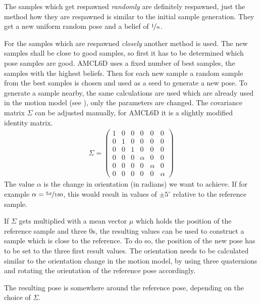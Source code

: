 \documentclass[Thesis.tex]{subfiles}
\begin{document}
The samples which get respawned \emph{randomly} are definitely respawned, just the method how they are respawned is similar to the initial sample generation. They get a new uniform random pose and a belief of $\nicefrac{1}{n}$.

For the samples which are respawned \emph{closely} another method is used. The new samples shall be close to good samples, so first it has to be determined which pose samples are good. \gls{AMCL6D} uses a fixed number of best samples, the samples with the highest beliefs. Then for each new sample a random sample from the best samples is chosen and used as a seed to generate a new pose. To generate a sample nearby, the same calculations are used which are already used in the motion model (see ), only the parameters are changed. The covariance matrix $\Sigma$ can be adjusted manually, for \gls{AMCL6D} it is a slightly modified identity matrix.
\begin{align}
\Sigma = \left(\begin{array}{cccccc}
1 & 0 & 0 & 0 & 0 & 0 \\
0 & 1 & 0 & 0 & 0 & 0 \\
0 & 0 & 1 & 0 & 0 & 0 \\
0 & 0 & 0 & \alpha & 0 & 0 \\
0 & 0 & 0 & 0 & \alpha & 0 \\
0 & 0 & 0 & 0 & 0 & \alpha
\end{array}\right)
\end{align}
The value $\alpha$ is the change in orientation (in radians) we want to achieve. If for example $\alpha = \nicefrac{5\pi}{180}$, this would result in values of $\pm 5^\circ$ relative to the reference sample.

If $\Sigma$ gets multiplied with a mean vector $\mu$ which holds the position of the reference sample and three $0$s, the resulting values can be used to construct a sample which is close to the reference. To do so, the position of the new pose has to be set to the three first result values. The orientation needs to be calculated similar to the orientation change in the motion model, by using three quaternions and rotating the orientation of the reference pose accordingly.

The resulting pose is somewhere around the reference pose, depending on the choice of $\Sigma$.
\end{document}
